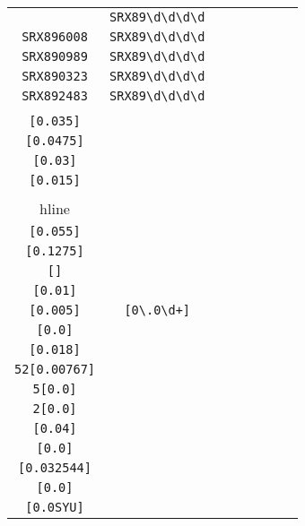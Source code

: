 \begin{longtable}{cccccccc}
\begin{tabular}{ll}
    \verb|SRX899986| & \verb|SRX89\d\d\d\d|\\
\verb|SRX896008| & \verb|SRX89\d\d\d\d|\\
\verb|SRX890989| & \verb|SRX89\d\d\d\d|\\
\verb|SRX890323| & \verb|SRX89\d\d\d\d|\\
\verb|SRX892483| & \verb|SRX89\d\d\d\d|
\end{tabular}
\\\midrule 
\begin{tabular}{l}
    \verb|[0.0175]|\\
\verb|[0.035]|\\
\verb|[0.0475]|\\
\verb|[0.03]|\\
\verb|[0.015]|\\
\\hline\\
\verb|[0.055]|\\
\verb|[0.1275]|\\
\verb|[]|\\
\verb|[0.01]|\\
\verb|[0.005]|
\end{tabular}

&
\verb|[0\.0\d+]|
&

\begin{tabular}{l}
    \verb|(\d)*[0\.0(\d)*]|\\
\verb|[0.0]|\\
\verb|[0.018]|\\
\verb|52[0.00767]|\\
\verb|5[0.0]|\\
\verb|2[0.0]|
\end{tabular}

&

\begin{tabular}{l}
    \verb|[0\.0(\u)*(\d)*]|\\
\verb|[0.04]|\\
\verb|[0.0]|\\
\verb|[0.032544]|\\
\verb|[0.0]|\\
\verb|[0.0SYU]|
\end{tabular}

&


\end{longtable}
